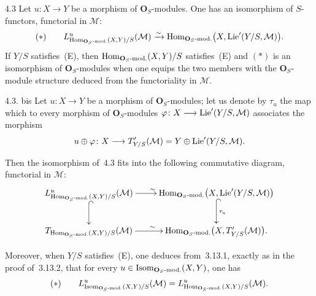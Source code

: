 \begin{proposition}{4.3}\label{II.4.3.prop}
Let \(u\colon X\to Y\) be a morphism of \(\mathbf{O}_{S}\)-modules. One has
an isomorphism of \(S\)-functors, functorial in \(\mathcal{M}\):
\[
(*)\qquad
L^{u}_{\operatorname{Hom}_{\mathbf{O}_{S}\text{-mod.}}(X,Y)/S}(\mathcal{M})
\xrightarrow{\sim}
\operatorname{Hom}_{\mathbf{O}_{S}\text{-mod.}}\bigl(X,\operatorname{Lie}'(Y/S,\mathcal{M})\bigr).
\]
{\renewcommand{\thefootnote}{(60)}}
If \(Y/S\) satisfies~(E), then
\(\operatorname{Hom}_{\mathbf{O}_{S}\text{-mod.}}(X,Y)/S\) satisfies~(E) and \((*)\) is an
isomorphism of \(\mathbf{O}_{S}\)-modules when one equips the two members
with the \(\mathbf{O}_{S}\)-module structure deduced from the functoriality
in \(\mathcal{M}\).
{\renewcommand{\thefootnote}{(61)}}
\end{proposition}

\begin{remark}{4.3. bis}\label{II.4.3.bis}
{\renewcommand{\thefootnote}{(62)}}
Let \(u\colon X\to Y\) be a morphism of \(\mathbf{O}_{S}\)-modules; let us
denote by \(\tau_{u}\) the map which to every morphism of
\(\mathbf{O}_{S}\)-modules
\(\varphi\colon X\longrightarrow\operatorname{Lie}'(Y/S,\mathcal{M})\) associates the morphism
\[
u\oplus\varphi\colon X\longrightarrow T'_{Y/S}(\mathcal{M})
=
Y\oplus\operatorname{Lie}'(Y/S,\mathcal{M}).
\]
\end{remark}

Then the isomorphism of~4.3 fits into the following commutative diagram,
functorial in \(\mathcal{M}\):
\[
\xymatrix{
L^{u}_{\Hom_{\mathbf{O}_{S}\text{-mod.}}(X,Y)/S}(\mathcal{M})
  \ar[r]^{\sim}
  \ar@{^{(}->}[d]
&
\Hom_{\mathbf{O}_{S}\text{-mod.}}\bigl(X,\Lie'(Y/S,\mathcal{M})\bigr)
  \ar@{^{(}->}[d]^{\tau_{u}}
\\
T_{\Hom_{\mathbf{O}_{S}\text{-mod.}}(X,Y)/S}(\mathcal{M})
  \ar[r]^{\sim}
&
\Hom_{\mathbf{O}_{S}\text{-mod.}}\bigl(X,T'_{Y/S}(\mathcal{M})\bigr).
}
\]

Moreover, when \(Y/S\) satisfies~(E), one deduces from~3.13.1, exactly as in
the proof of~3.13.2, that for every
\(u\in\operatorname{Isom}_{\mathbf{O}_{S}\text{-mod.}}(X,Y)\), one has
\[
(*)\qquad
L^{u}_{\operatorname{Isom}_{\mathbf{O}_{S}\text{-mod.}}(X,Y)/S}(\mathcal{M})
=
L^{u}_{\operatorname{Hom}_{\mathbf{O}_{S}\text{-mod.}}(X,Y)/S}(\mathcal{M}).
\]


